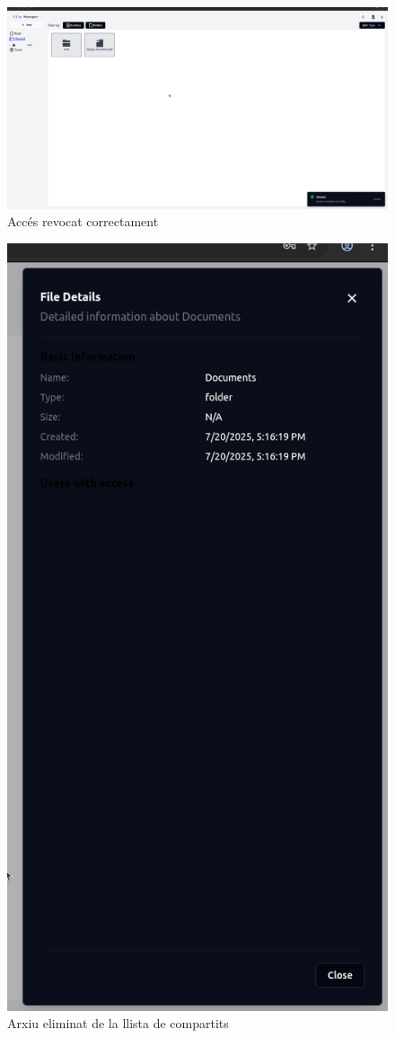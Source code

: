 \begin{figure}[H]
\centering
\includegraphics[width=0.7\linewidth]{Figures/implementacio/stopSeeingSuccess.png}
\caption{Accés revocat correctament}
\label{fig:stopSeeingSuccess}
\end{figure}

\begin{figure}[H]
\centering
\includegraphics[width=0.8\linewidth]{Figures/implementacio/sharedFileRemoved.png}
\caption{Arxiu eliminat de la llista de compartits}
\label{fig:sharedFileRemoved}
\end{figure}

